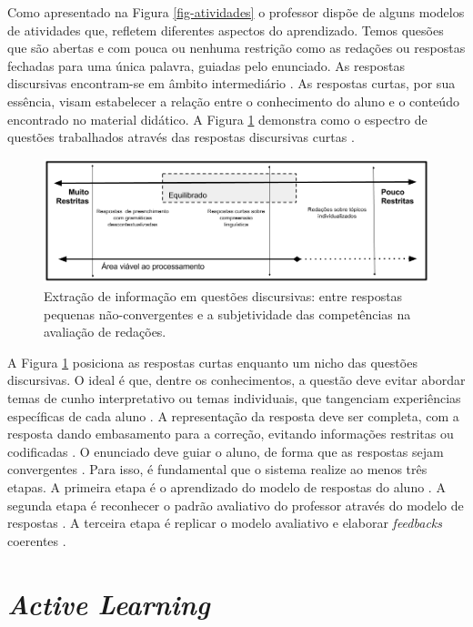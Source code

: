 Como apresentado na Figura \ref{fig-atividades} o professor dispõe de alguns modelos de atividades que, refletem diferentes aspectos do aprendizado. Temos quesões que são abertas e com pouca ou nenhuma restrição como as redações \cite{almeida-junior2017} ou respostas fechadas para uma única palavra, guiadas pelo enunciado. As respostas discursivas encontram-se em âmbito intermediário \cite{bailey2008}. As respostas curtas, por sua essência, visam estabelecer a relação entre o conhecimento do aluno e o conteúdo encontrado no material didático. A Figura \ref{fig-SAG-concepts} demonstra como o espectro de questões trabalhados através das respostas discursivas curtas \cite{spalenza2017}.

\begin{figure}[!h]
\centering
\includegraphics[width=\textwidth]{figuras/aprendizadoSAG}
\caption{Extração de informação em questões discursivas: entre respostas pequenas não-convergentes e a subjetividade das competências na avaliação de redações.}
\label{fig-SAG-concepts}
\end{figure}

A Figura \ref{fig-SAG-concepts} posiciona as respostas curtas enquanto um nicho das questões discursivas. O ideal é que, dentre os conhecimentos, a questão deve evitar abordar temas de cunho interpretativo ou temas individuais, que tangenciam experiências específicas de cada aluno \cite{siddiqi2008}. A representação da resposta deve ser completa, com a resposta dando embasamento para a correção, evitando informações restritas ou codificadas \cite{ding2020}. O enunciado deve guiar o aluno, de forma que as respostas sejam convergentes \cite{suzen2020, filighera2020}. Para isso, é fundamental que o sistema realize ao menos três etapas. A primeira etapa é o aprendizado do modelo de respostas do aluno \cite{ramachandran2015b}. A segunda etapa é reconhecer o padrão avaliativo do professor através do modelo de respostas \cite{funayama2020}. A terceira etapa é replicar o modelo avaliativo e elaborar \textit{feedbacks} coerentes \cite{fowler2021}.


\section{\textit{Active Learning}}


